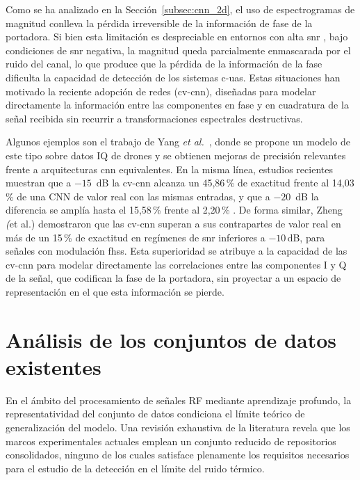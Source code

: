 Como se ha analizado en la Sección~\ref{subsec:cnn_2d}, el uso de espectrogramas de magnitud conlleva la pérdida irreversible de la información de fase de la portadora. Si bien esta limitación es despreciable en entornos con alta \gls{snr} \cite{ezuma_detection_2020}, bajo condiciones de \gls{snr} negativa, la magnitud queda parcialmente enmascarada por el ruido del canal, lo que produce que la pérdida de la información de la fase dificulta la capacidad de detección de los sistemas \gls{c-uas}. Estas situaciones han motivado la reciente adopción de redes (\gls{cv-cnn}), diseñadas para modelar directamente la información entre las componentes en fase y en cuadratura de la señal recibida sin recurrir a transformaciones espectrales destructivas.

Algunos ejemplos son el trabajo de Yang \textit{et al.}~\cite{yang_deep_2022}, donde se propone un modelo de este tipo sobre datos IQ de drones y se obtienen mejoras de precisión relevantes frente a arquitecturas \gls{cnn} equivalentes. En la misma línea, estudios recientes muestran que a $-15$~dB la \gls{cv-cnn} alcanza un 45,86\,\% de exactitud frente al 14,03\,\% de una CNN de valor real con las mismas entradas, y que a $-20$~dB la diferencia se amplía hasta el 15,58\,\% frente al 2,20\,\% \cite{xin_radio_2026}. De forma similar, Zheng \textit(et al.) \cite{zheng_uavsignal_2025} demostraron que las \gls{cv-cnn} superan a sus contrapartes de valor real en más de un 15\,\% de exactitud en regímenes de \gls{snr} inferiores a $-10$\,dB, para señales con modulación \gls{fhss}. Esta superioridad se atribuye a la capacidad de las \gls{cv-cnn} para modelar directamente las correlaciones entre las componentes I y Q de la señal, que codifican la fase de la portadora, sin proyectar a un espacio de representación en el que esta información se pierde.

\section{Análisis de los conjuntos de datos existentes}
\label{sec:analisis_datasets}

En el ámbito del procesamiento de señales RF mediante aprendizaje profundo, la representatividad del conjunto de datos condiciona el límite teórico de generalización del modelo. Una revisión exhaustiva de la literatura revela que los marcos experimentales actuales emplean un conjunto reducido de repositorios consolidados, ninguno de los cuales satisface plenamente los requisitos necesarios para el estudio de la detección en el límite del ruido térmico.

